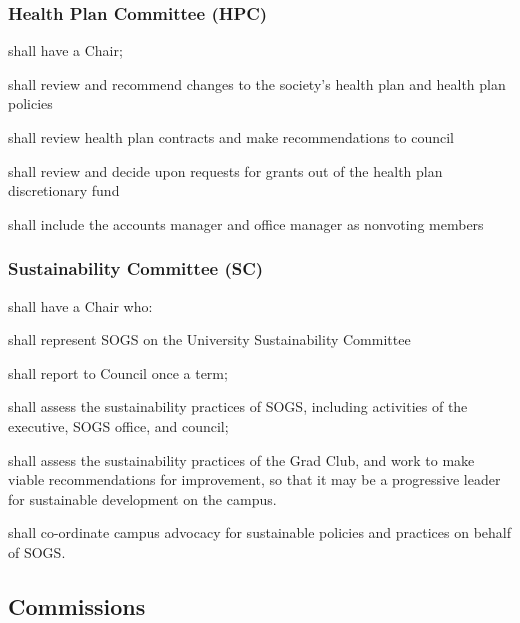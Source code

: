 \subsubsection{Health Plan Committee (HPC)} 
\begin{longenum}[ label*=\thesubsubsection.\arabic*., align=left]
	\item shall have a Chair;
    \item shall review and recommend changes to the society's health plan and health plan policies 
    \item shall review health plan contracts and make recommendations to council 
    \item shall review and decide upon requests for grants out of the health plan discretionary fund
    \item shall include the accounts manager and office manager as nonvoting members
\end{longenum}

\subsubsection{Sustainability Committee (SC)}
\begin{longenum}[ label*=\thesubsubsection.\arabic*., align=left]
	
    \item shall have a Chair who:
    \begin{longenum}[ label*=\arabic*., align=left]
		\item shall represent SOGS on the University Sustainability Committee
        \item shall report to Council once a term;
	\end{longenum}
    \item shall assess the sustainability practices of SOGS, including activities of the executive, SOGS office, and council;
    \item shall assess the sustainability practices of the Grad Club, and work to make viable recommendations for improvement, so that it  may be a progressive leader for sustainable development  on the campus. 
    \item shall co-ordinate campus advocacy for sustainable policies and practices on behalf of SOGS.
\end{longenum}


\subsection{Commissions}
